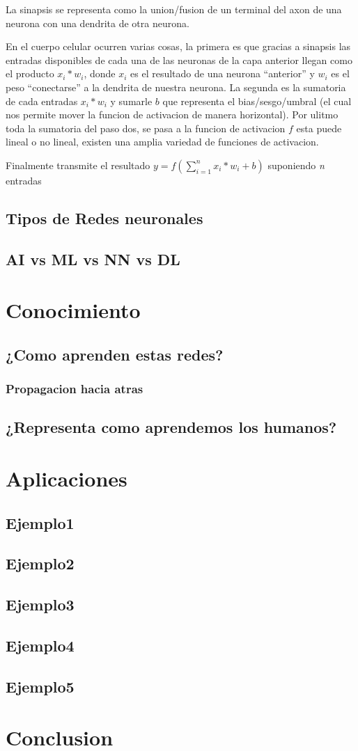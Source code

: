 \documentclass[runningheads]{llncs} %
\begin{document}
La sinapsis se representa como la union/fusion de un terminal del axon de una neurona
con una dendrita de otra neurona. 

En el cuerpo celular ocurren varias cosas, la primera es que gracias a sinapsis las
entradas disponibles de cada una de las neuronas de la capa anterior llegan como el 
producto \(x_{i}*w_{i}\), donde \(x_{i}\) es el resultado de una neurona 
\textquotedblleft{anterior}\textquotedblright{} y \(w_{i}\) es el peso 
\textquotedblleft{conectarse}\textquotedblright{} a la dendrita de nuestra neurona.
La segunda es la sumatoria de cada entradas \(x_{i}*w_{i}\) y sumarle
\(b\) que representa el bias/sesgo/umbral (el cual nos permite mover la funcion
de activacion de manera horizontal).
Por ulitmo toda la sumatoria del paso dos, se pasa a la funcion de activacion \(f\)
esta puede lineal o no lineal, existen una amplia variedad de funciones de activacion.

Finalmente transmite el resultado \(y = f(\sum_{i=1}^{n}{x_{i}*w_{i}} + b)\)
suponiendo \textit{n} entradas

\subsection{Tipos de Redes neuronales}
\subsection{AI vs ML vs NN vs DL}
\section{Conocimiento}
\subsection{¿Como aprenden estas redes?}
\subsubsection{Propagacion hacia atras}
\subsection{¿Representa como aprendemos los humanos?}
\section{Aplicaciones}
\subsection{Ejemplo1}
\subsection{Ejemplo2}
\subsection{Ejemplo3}
\subsection{Ejemplo4}
\subsection{Ejemplo5}
\section{Conclusion}

\newpage
\printbibliography
\end{document}
